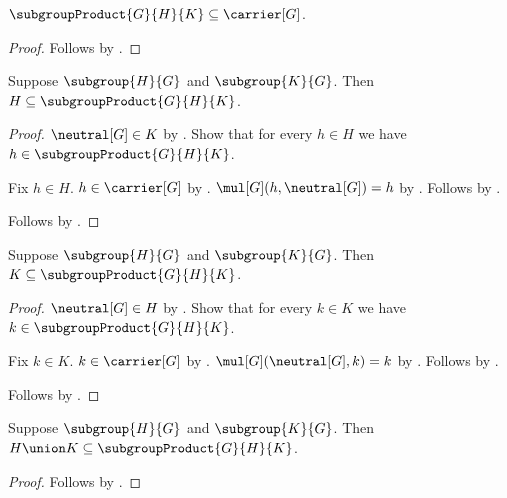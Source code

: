 \begin{proposition}\label{subgroup_product_subseteq_carrier}
    $\subgroupProduct{G}{H}{K}\subseteq\carrier[G]$.
\end{proposition}
\begin{proof}
    Follows by .
\end{proof}

\begin{proposition}\label{subgroup_product_contains_left}
    Suppose $\subgroup{H}{G}$ and $\subgroup{K}{G}$.
    Then $H\subseteq\subgroupProduct{G}{H}{K}$.
\end{proposition}
\begin{proof}
    $\neutral[G]\in K$ by .
    Show that for every $h\in H$ we have
        $h\in\subgroupProduct{G}{H}{K}$.
    \begin{subproof}
        Fix $h\in H$.
        $h\in\carrier[G]$ by
            .
        $\mul[G](h,\neutral[G])=h$ by
            .
        Follows by .
    \end{subproof}
    Follows by .
\end{proof}

\begin{proposition}\label{subgroup_product_contains_right}
    Suppose $\subgroup{H}{G}$ and $\subgroup{K}{G}$.
    Then $K\subseteq\subgroupProduct{G}{H}{K}$.
\end{proposition}
\begin{proof}
    $\neutral[G]\in H$ by .
    Show that for every $k\in K$ we have
        $k\in\subgroupProduct{G}{H}{K}$.
    \begin{subproof}
        Fix $k\in K$.
        $k\in\carrier[G]$ by
            .
        $\mul[G](\neutral[G],k)=k$ by
            .
        Follows by .
    \end{subproof}
    Follows by .
\end{proof}

\begin{corollary}\label{subgroup_product_contains_union}
    Suppose $\subgroup{H}{G}$ and $\subgroup{K}{G}$.
    Then $H\union K\subseteq\subgroupProduct{G}{H}{K}$.
\end{corollary}
\begin{proof}
    Follows by
        .
\end{proof}

